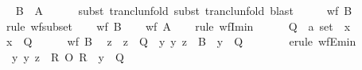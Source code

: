 \begin{isabellebody}
\ \isamarkupfalse%
\ {\isachardoublequoteopen}{\isacharquery}{\kern0pt}B\ {\isasymsubseteq}\ {\isacharquery}{\kern0pt}A\isactrlsup {\isacharplus}{\kern0pt}{\isachardoublequoteclose}\isanewline
\ \ \ \ \isamarkupfalse%
\ {\isacharparenleft}{\kern0pt}subst\ trancl{\isacharunderscore}{\kern0pt}unfold{\isacharcomma}{\kern0pt}\ subst\ trancl{\isacharunderscore}{\kern0pt}unfold{\isacharparenright}{\kern0pt}\ blast\isanewline
\ \ \isamarkupfalse%
\ \isamarkupfalse%
\ {\isachardoublequoteopen}wf\ {\isacharquery}{\kern0pt}B{\isachardoublequoteclose}\ \isamarkupfalse%
\ {\isacharparenleft}{\kern0pt}rule\ wf{\isacharunderscore}{\kern0pt}subset{\isacharparenright}{\kern0pt}\isanewline
{}\isamarkupfalse%
\isanewline
\ \ \isamarkupfalse%
\ {\isachardoublequoteopen}wf\ {\isacharquery}{\kern0pt}B{\isachardoublequoteclose}\isanewline
\ \ \isamarkupfalse%
\ {\isachardoublequoteopen}wf\ {\isacharquery}{\kern0pt}A{\isachardoublequoteclose}\isanewline
\ \ \isamarkupfalse%
\ {\isacharparenleft}{\kern0pt}rule\ wfI{\isacharunderscore}{\kern0pt}min{\isacharparenright}{\kern0pt}\isanewline
\ \ \ \ \isamarkupfalse%
\ Q\ {\isacharcolon}{\kern0pt}{\isacharcolon}{\kern0pt}\ {\isachardoublequoteopen}{\isacharprime}{\kern0pt}a\ set{\isachardoublequoteclose}\ \ x\isanewline
\ \ \ \ \isamarkupfalse%
\ {\isachardoublequoteopen}x\ {\isasymin}\ Q{\isachardoublequoteclose}\isanewline
\ \ \ \ \isamarkupfalse%
\ {\isacartoucheopen}wf\ {\isacharquery}{\kern0pt}B{\isacartoucheclose}\ \isamarkupfalse%
\ z\ \ {\isachardoublequoteopen}z\ {\isasymin}\ Q{\isachardoublequoteclose}\ \ {\isachardoublequoteopen}{\isasymAnd}y{\isachardot}{\kern0pt}\ {\isacharparenleft}{\kern0pt}y{\isacharcomma}{\kern0pt}\ z{\isacharparenright}{\kern0pt}\ {\isasymin}\ {\isacharquery}{\kern0pt}B\ {\isasymLongrightarrow}\ y\ {\isasymnotin}\ Q{\isachardoublequoteclose}\isanewline
\ \ \ \ \ \ \isamarkupfalse%
\ {\isacharparenleft}{\kern0pt}erule\ wfE{\isacharunderscore}{\kern0pt}min{\isacharparenright}{\kern0pt}\isanewline
\ \ \ \ \isamarkupfalse%
\ \isamarkupfalse%
\ {}{\isacharcolon}{\kern0pt}\ {\isachardoublequoteopen}{\isasymAnd}y{\isachardot}{\kern0pt}\ {\isacharparenleft}{\kern0pt}y{\isacharcomma}{\kern0pt}\ z{\isacharparenright}{\kern0pt}\ {\isasymin}\ R\ O\ R\ {\isasymLongrightarrow}\ y\ {\isasymnotin}\ Q{\isachardoublequoteclose}\isanewline

\end{isabellebody}
